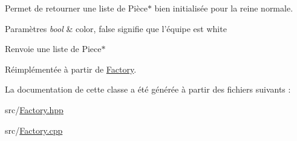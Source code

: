 Permet de retourner une liste de Pièce$\ast$ bien initialisée pour la reine normale. 


\begin{DoxyParams}{Paramètres}
{\em bool} & color, false signifie que l'équipe est white \\
\hline
\end{DoxyParams}
\begin{DoxyReturn}{Renvoie}
une liste de Piece$\ast$ 
\end{DoxyReturn}


Réimplémentée à partir de \hyperlink{class_factory_a90f20f663caa6e5a5370465d3014630f}{Factory}.



La documentation de cette classe a été générée à partir des fichiers suivants \-:\begin{DoxyCompactItemize}
\item 
src/\hyperlink{_factory_8hpp}{Factory.\-hpp}\item 
src/\hyperlink{_factory_8cpp}{Factory.\-cpp}\end{DoxyCompactItemize}

